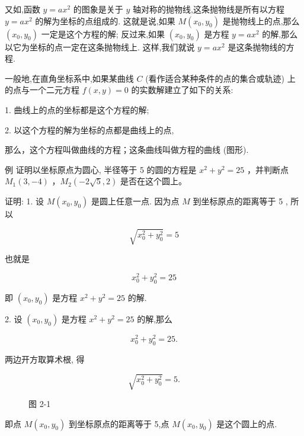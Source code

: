 \documentclass[lang=cn,newtx,12pt,scheme=chinese]{elegantbook}
\begin{document}
又如,函数 \(y = a{x}^{2}\) 的图象是关于 \(y\) 轴对称的抛物线,这条抛物线是所有以方程 \(y = a{x}^{2}\) 的解为坐标的点组成的. 这就是说,如果 \(M\left( {{x}_{0},{y}_{0}}\right)\) 是抛物线上的点,那么 \(\left( {{x}_{0},{y}_{0}}\right)\) 一定是这个方程的解; 反过来,如果 \(\left( {{x}_{0},{y}_{0}}\right)\) 是方程 \(y = a{x}^{2}\) 的解,那么以它为坐标的点一定在这条抛物线上. 这样,我们就说 \(y = a{x}^{2}\) 是这条抛物线的方程.

\begin{corollary}[曲线和方程的关系]	
一般地,在直角坐标系中,如果某曲线 \(C\) (看作适合某种条件的点的集合或轨迹) 上的点与一个二元方程 \(f\left( {x,y}\right) = 0\) 的实数解建立了如下的关系:

1. 曲线上的点的坐标都是这个方程的解;

2. 以这个方程的解为坐标的点都是曲线上的点,

那么，这个方程叫做曲线的方程；这条曲线叫做方程的曲线 (图形).
\end{corollary}

例  证明以坐标原点为圆心, 半径等于 5 的圆的方程是 \({x}^{2} + {y}^{2} = {25}\) ，并判断点 \( {M}_{1} \left( {3, - 4} \right) \) ，\( {M}_{2} \left(  {-2\sqrt{5},2} \right) \) 是否在这个圆上。

证明: 1. 设 \(M\left( {{x}_{0},{y}_{0}}\right)\) 是圆上任意一点. 因为点 \(M\) 到坐标原点的距离等于 5 , 所以

\[
  \sqrt{{x}_{0}^{2} + {y}_{0}^{2}} = 5
\]

也就是

\[
    {x}_{0}^{2} + {y}_{0}^{2} = {25}
\]

即 \(\left( {{x}_{0},{y}_{0}}\right)\) 是方程 \({x}^{2} + {y}^{2} = {25}\) 的解.

2. 设 \(\left( {{x}_{0},{y}_{0}}\right)\) 是方程 \({x}^{2} + {y}^{2} = {25}\) 的解,那么

\[
    {x}_{0}^{2} + {y}_{0}^{2} = {25}\text{.}
\]

两边开方取算术根, 得

\[
  \sqrt{{x}_{0}^{2} + {y}_{0}^{2}} = 5\text{.}
\]

\begin{figure}[h]
  \centering
  
  \caption{图 2-1}
\end{figure}

即点 \(M\left( {{x}_{0},{y}_{0}}\right)\) 到坐标原点的距离等于 5,点 \(M\left( {{x}_{0},{y}_{0}}\right)\) 是这个圆上的点.
\end{document}
